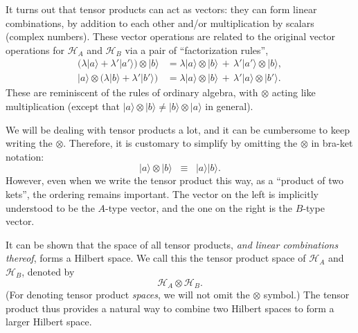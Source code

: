 \documentclass[pra,12pt]{revtex4-2}
\begin{document}
It turns out that tensor products can act as vectors: they can form
linear combinations, by addition to each other and/or multiplication
by scalars (complex numbers).  These vector operations are related to
the original vector operations for $\mathscr{H}_A$ and $\mathscr{H}_B$
via a pair of ``factorization rules'',
\begin{align}
  \Big(\lambda |a\rangle
  + \lambda' |a'\rangle\Big) \otimes |b\rangle &=
  \lambda |a\rangle \otimes |b\rangle \,+\,
  \lambda' |a'\rangle \otimes |b\rangle, \label{tensorrule1} \\
  |a\rangle \otimes \Big(\lambda |b\rangle
  + \lambda' |b'\rangle\Big) &=
  \lambda |a\rangle \otimes |b\rangle \,+\,
  \lambda' |a\rangle \otimes |b'\rangle.
  \label{tensorrule2} 
\end{align}
These are reminiscent of the rules of ordinary algebra, with $\otimes$
acting like multiplication (except that $|a\rangle\otimes|b\rangle \ne
|b\rangle\otimes|a\rangle$ in general).

We will be dealing with tensor products a lot, and it can be
cumbersome to keep writing the $\otimes$.  Therefore, it is customary
to simplify by omitting the $\otimes$ in bra-ket notation:
\begin{equation}
  |a \rangle \otimes |b\rangle \;\; \equiv \;\; |a \rangle |b\rangle.
\end{equation}
However, even when we write the tensor product this way, as a
``product of two kets'', the ordering remains important.  The vector
on the left is implicitly understood to be the $A$-type vector, and
the one on the right is the $B$-type vector.

It can be shown that the space of all tensor products, \textit{and
  linear combinations thereof}, forms a Hilbert space.  We call this
the tensor product space of $\mathscr{H}_A$ and $\mathscr{H}_B$,
denoted by
\begin{equation*}
  \mathscr{H}_A\otimes \mathscr{H}_B.
\end{equation*}
(For denoting tensor product \textit{spaces}, we will not omit the
$\otimes$ symbol.)  The tensor product thus provides a natural way to combine two Hilbert spaces to form a larger Hilbert space.
\end{document}
